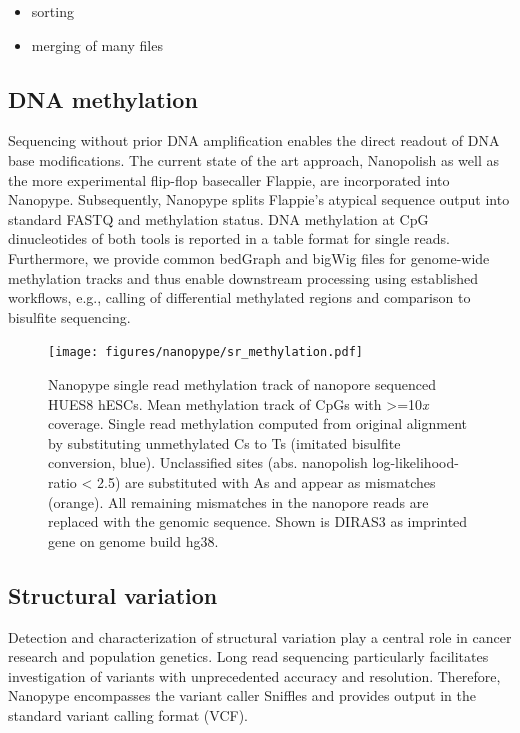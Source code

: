 \begin{itemize}
	\item sorting
	\item merging of many files
\end{itemize}

\subsection{DNA methylation}
\label{subsec:nanopype:methylation}
Sequencing without prior DNA amplification enables the direct readout of DNA base modifications. The current state of the art approach, Nanopolish \cite{Simpson2017} as well as the more experimental flip-flop basecaller Flappie, are incorporated into Nanopype. Subsequently, Nanopype splits Flappie’s atypical sequence output into standard FASTQ and methylation status. DNA methylation at CpG dinucleotides of both tools is reported in a table format for single reads. Furthermore, we provide common bedGraph and bigWig files for genome-wide methylation tracks and thus enable downstream processing using established workflows, e.g., calling of differential methylated regions and comparison to bisulfite sequencing.

\begin{figure}[h]
	\centering
	\texttt{[image: figures/nanopype/sr\_methylation.pdf]}
	\captionsetup{format=plain}
	\caption[Nanopype single read methylation track]{Nanopype single read methylation track of nanopore sequenced HUES8 hESCs. Mean methylation track of CpGs with >=10\textit{x} coverage. Single read methylation computed from original alignment by substituting unmethylated Cs to Ts (imitated bisulfite conversion, blue). Unclassified sites (abs. nanopolish log-likelihood-ratio < 2.5) are substituted with As and appear as mismatches (orange). All remaining mismatches in the nanopore reads are replaced with the genomic sequence. Shown is DIRAS3 as imprinted gene on genome build hg38.}
	\label{fig:nanopype:sr_methylation}
\end{figure}


\subsection{Structural variation}
\label{subsec:nanopype:sv}
Detection and characterization of structural variation play a central role in cancer research and population genetics. Long read sequencing particularly facilitates investigation of variants with unprecedented accuracy and resolution. Therefore, Nanopype encompasses the variant caller Sniffles \cite{Sedlazeck2018} and provides output in the standard variant calling format (VCF).

